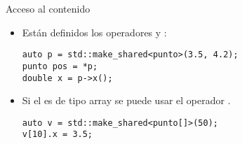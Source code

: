 \begin{frame}[t,fragile]{Acceso al contenido}
\begin{itemize}
  \item Están definidos los operadores \cppkey{*} y \cppkey{->}:
\begin{lstlisting}
auto p = std::make_shared<punto>(3.5, 4.2);
punto pos = *p;
double x = p->x();
\end{lstlisting}

  \item Si el  es de tipo array se puede usar el operador \cppkey{[]}.
\begin{lstlisting}
auto v = std::make_shared<punto[]>(50);
v[10].x = 3.5;
\end{lstlisting}

\end{itemize}
\end{frame}
